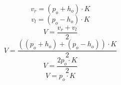 \documentclass[12pt]{article}
\begin{document}
$$v_{r} = (p_{o} + h_{o}) \cdot K$$
$$v_{l} = (p_{o} - h_{o}) \cdot K$$
$$V = \frac{v_{r} + v_{l}} {2}$$
$$V = \frac{((p_{o} + h_{o}) + (p_{o} - h_{o})) \cdot K} {2}$$
$$V = \frac{2p_{o} \cdot K} {2}$$
$$V = p_{o} \cdot K$$
\end{document}
